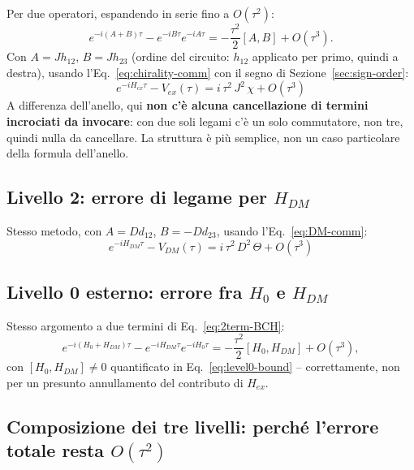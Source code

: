 \documentclass[11pt,a4paper]{article}
\begin{document}
Per due operatori, espandendo in serie fino a $O(\tau^2)$:
\begin{equation}
e^{-i(A+B)\tau}-e^{-iB\tau}e^{-iA\tau} = -\frac{\tau^2}2[A,B]+O(\tau^3).
\label{eq:2term-BCH}
\end{equation}
Con $A=Jh_{12}$, $B=Jh_{23}$ (ordine del circuito: $h_{12}$ applicato per primo, quindi a destra), usando l'Eq.~\eqref{eq:chirality-comm} con il segno di Sezione~\ref{sec:sign-order}:
\begin{equation}
\boxed{e^{-iH_{ex}\tau}-V_{ex}(\tau) = i\,\tau^2\,J^2\,\chi + O(\tau^3)}
\label{eq:error-Hex-final}
\end{equation}
A differenza dell'anello, qui \textbf{non c'è alcuna cancellazione di termini incrociati da invocare}: con due soli legami c'è un solo commutatore, non tre, quindi nulla da cancellare. La struttura è più semplice, non un caso particolare della formula dell'anello.

\subsection{Livello 2: errore di legame per $H_{DM}$}

Stesso metodo, con $A=Dd_{12}$, $B=-Dd_{23}$, usando l'Eq.~\eqref{eq:DM-comm}:
\begin{equation}
\boxed{e^{-iH_{DM}\tau}-V_{DM}(\tau) = i\,\tau^2\,D^2\,\Theta + O(\tau^3)}
\label{eq:error-HDM-final}
\end{equation}

\subsection{Livello 0 esterno: errore fra $H_0$ e $H_{DM}$}

Stesso argomento a due termini di Eq.~\eqref{eq:2term-BCH}:
\begin{equation}
e^{-i(H_0+H_{DM})\tau}-e^{-iH_{DM}\tau}e^{-iH_0\tau} = -\frac{\tau^2}2[H_0,H_{DM}]+O(\tau^3),
\label{eq:error-outer}
\end{equation}
con $[H_0,H_{DM}]\neq0$ quantificato in Eq.~\eqref{eq:level0-bound} -- correttamente, non per un presunto annullamento del contributo di $H_{ex}$.

\subsection{Composizione dei tre livelli: perché l'errore totale resta $O(\tau^2)$}
\end{document}
